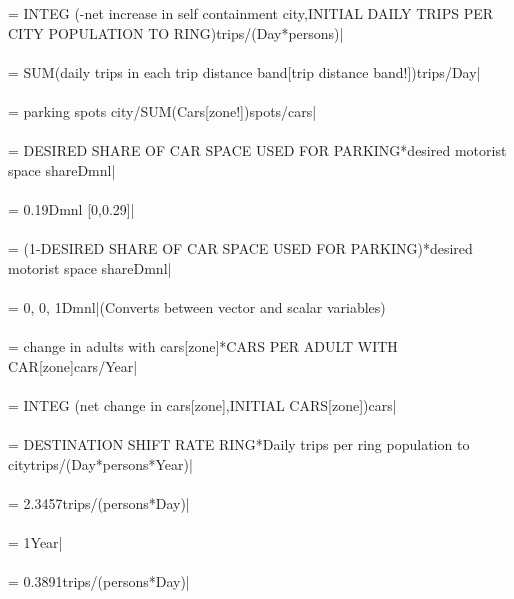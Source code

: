  = {\small  INTEG (-net increase in self containment city,INITIAL DAILY TRIPS PER CITY POPULATION TO RING)trips/(Day*persons)|} \\ \\ 
 = {\small SUM(daily trips in each trip distance band[trip distance band!])trips/Day|} \\ \\ 
 = {\small parking spots city/SUM(Cars[zone!])spots/cars|} \\ \\ 
 = {\small DESIRED SHARE OF CAR SPACE USED FOR PARKING*desired motorist space shareDmnl|} \\ \\ 
 = {\small 0.19Dmnl [0,0.29]|} \\ \\ 
 = {\small (1-DESIRED SHARE OF CAR SPACE USED FOR PARKING)*desired motorist space shareDmnl|} \\ \\ 
 = {\small 0, 0, 1Dmnl|}{\small  (Converts between vector and scalar variables)} \\ \\ 
 = {\small change in adults with cars[zone]*CARS PER ADULT WITH CAR[zone]cars/Year|} \\ \\ 
 = {\small  INTEG (net change in cars[zone],INITIAL CARS[zone])cars|} \\ \\ 
 = {\small DESTINATION SHIFT RATE RING*Daily trips per ring population to citytrips/(Day*persons*Year)|} \\ \\ 
 = {\small 2.3457trips/(persons*Day)|} \\ \\ 
 = {\small 1Year|} \\ \\ 
 = {\small 0.3891trips/(persons*Day)|} \\ \\ 
